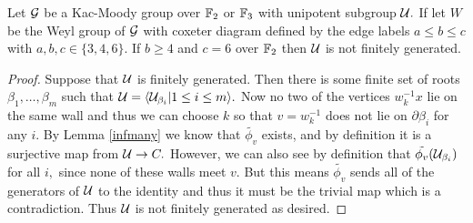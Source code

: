 \documentclass[class=book, crop=false,12 pt]{standalone}
\begin{document}
\begin{theorem} Let $\mathcal{G}$ be a Kac-Moody group over $\mathbb{F}_{2}$ or $\mathbb{F}_{3}$ with unipotent subgroup $\mathcal{U}.$ If let $W$ be the Weyl group of $\mathcal{G}$ with coxeter diagram defined by the edge labels $a\le b\le c$ with $a,b,c\in \{3,4,6\}.$ If $b\ge 4$ and $c=6$ over $\mathbb{F}_{2}$ then $\mathcal{U}$ is not finitely generated.
	\label{notfinitelygenerated}
\end{theorem}
\begin{proof}
	Suppose that $\mathcal{U}$ is finitely generated. Then there is some finite set of roots $\beta_1,\dots,\beta_m$ such that $\mathcal{U}=\langle \mathcal{U}_{\beta_i}|1\le i\le m\rangle.$ Now no two of the vertices $w_k^{-1}x$ lie on the same wall and thus we can choose $k$ so that $v=w_k^{-1}$ does not lie on $\partial \beta_i$ for any $i.$ By Lemma \ref{infmany} we know that $\tilde{\phi_v}$ exists, and by definition it is a surjective map from $\mathcal{U}\to C.$ However, we can also see by definition that $\tilde{\phi_v}(\mathcal{U}_{\beta_i})$ for all $i,$ since none of these walls meet $v.$ But this means $\tilde{\phi_v}$ sends all of the generators of $\mathcal{U}$ to the identity and thus it must be the trivial map which is a contradiction. Thus $\mathcal{U}$ is not finitely generated as desired.
\end{proof}
\end{document}
